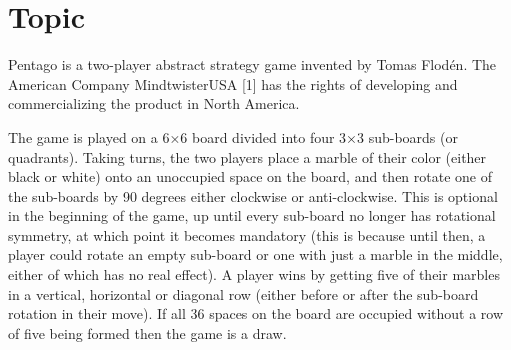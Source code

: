 \section{Topic}
\label{Topic}
Pentago is a two-player abstract strategy game invented by Tomas Flodén. The American Company MindtwisterUSA [1] has the rights of developing and commercializing the product in North America.

The game is played on a 6×6 board divided into four 3×3 sub-boards (or quadrants). Taking turns, the two players place a marble of their color (either black or white) onto an unoccupied space on the board, and then rotate one of the sub-boards by 90 degrees either clockwise or anti-clockwise. This is optional in the beginning of the game, up until every sub-board no longer has rotational symmetry, at which point it becomes mandatory (this is because until then, a player could rotate an empty sub-board or one with just a marble in the middle, either of which has no real effect). A player wins by getting five of their marbles in a vertical, horizontal or diagonal row (either before or after the sub-board rotation in their move). If all 36 spaces on the board are occupied without a row of five being formed then the game is a draw.